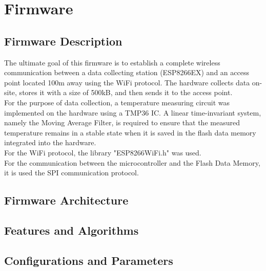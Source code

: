 \newpage

\section{Firmware}\label{04Sec:Firmware}


\subsection{Firmware Description}\label{04Sub:FirmwareDescription}

The ultimate goal of this firmware is to establish a complete wireless communication 
between a data collecting station (ESP8266EX) and an access point located 100m away 
using the WiFi protocol. The hardware collects data on-site, stores it with a size of 500kB, 
and then sends it to the access point. \\ 

For the purpose of data collection, a temperature measuring circuit was implemented
on the hardware using a TMP36 IC. A linear time-invariant system, namely the Moving 
Average Filter, is required to ensure that the measured temperature remains in a stable
state when it is saved in the flash data memory integrated into the hardware. \\ 

For the WiFi protocol, the library "ESP8266WiFi.h" was used. \\
  

For the communication between the microcontroller and the Flash Data Memory, it is used the SPI 
communication protocol.


\subsection{Firmware Architecture}\label{04Sub:FirmwareArchitecture}


\subsection{Features and Algorithms}\label{04Sub:FeaturesAndAlgorithms}


\subsection{Configurations and Parameters}\label{04Sub: ConfigurationsAndParameters}


